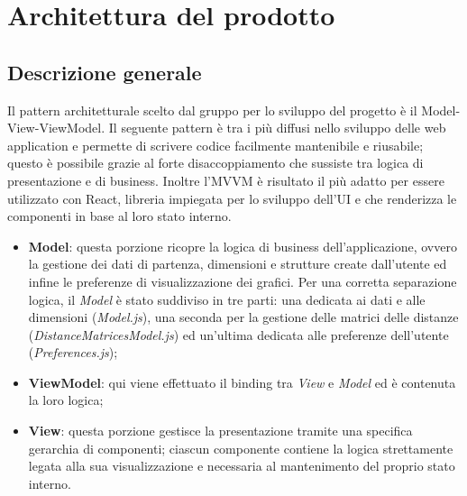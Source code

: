 \section{Architettura del prodotto}
\subsection{Descrizione generale}
Il pattern architetturale scelto dal gruppo per lo sviluppo del progetto è il Model-View-ViewModel. Il seguente pattern è tra i più diffusi nello sviluppo delle web application e permette di scrivere codice facilmente mantenibile e riusabile; questo è possibile grazie al forte disaccoppiamento che sussiste tra logica di presentazione e di business. Inoltre l'MVVM è risultato il più adatto per essere utilizzato con React, libreria impiegata per lo sviluppo dell'UI e che renderizza le componenti in base al loro stato interno.
\begin{itemize}
\item \textbf{Model}: questa porzione ricopre la logica di business dell'applicazione, ovvero la gestione dei dati di partenza, dimensioni e strutture create dall'utente ed infine le preferenze di visualizzazione dei grafici. Per una corretta separazione logica, il \textit{Model} è stato suddiviso in tre parti: una dedicata ai dati e alle dimensioni (\textit{Model.js}), una seconda per la gestione delle matrici delle distanze (\textit{DistanceMatricesModel.js}) ed un'ultima dedicata alle preferenze dell'utente (\textit{Preferences.js});

\item \textbf{ViewModel}: qui viene effettuato il binding tra \textit{View} e \textit{Model} ed è contenuta la loro logica;

\item \textbf{View}: questa porzione gestisce la presentazione tramite una specifica gerarchia di componenti; ciascun componente contiene la logica strettamente legata alla sua visualizzazione e necessaria al mantenimento del proprio stato interno.
\end{itemize}

